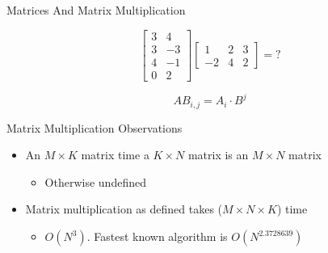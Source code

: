 \documentclass{beamer}
\begin{document}
\begin{frame}{Matrices And Matrix Multiplication}

\[ \left[ \begin{array}{cc} 3 & 4  \\ 3 & -3  \\ 4 & -1  \\ 0 & 2 \end{array} \right]  \left[ \begin{array}{ccc} 1 & 2 & 3  \\ -2 & 4 & 2 \end{array} \right]   =  ?  \]

\[ AB_{i, j} = A_i \cdot B^j \]


\end{frame}





\begin{frame}{Matrix Multiplication Observations}

\begin{itemize}[label=$\vartriangleright$]

    \item An $M \times K$ matrix time a $K \times N$ matrix is an $M \times N$ matrix
        \begin{itemize}[label=$\blacktriangleright$]
            \item Otherwise undefined
        \end{itemize}

    \item Matrix multiplication as defined takes ($M \times N \times K$) time
        \begin{itemize}[label=$\blacktriangleright$]
            \item $O(N^3)$.  Fastest known algorithm is $O(N^{2.3728639})$
        \end{itemize}

\end{itemize}

\end{frame}
\end{document}
